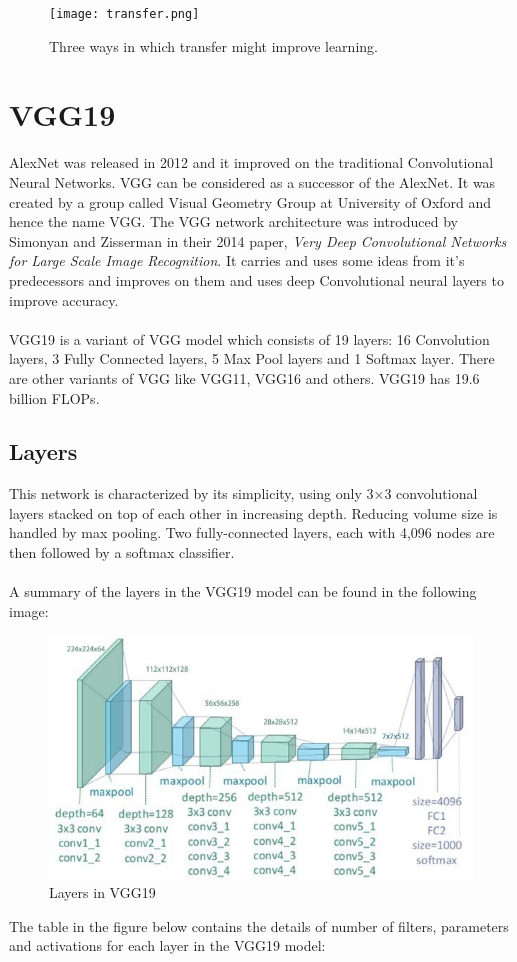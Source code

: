 \begin{figure}[h]
	\label{ss}
	\centering
	\texttt{[image: transfer.png]}
	\caption{Three ways in which transfer might improve learning.}
\end{figure}

\section{VGG19}
AlexNet was released in 2012 and it improved on the traditional Convolutional Neural Networks. VGG can be considered as a successor of the AlexNet. It was created by a group called Visual Geometry Group at University of Oxford and hence the name VGG. The VGG network architecture was introduced by Simonyan and Zisserman in their 2014 paper, \emph{Very Deep Convolutional Networks for Large Scale Image Recognition}. It carries and uses some ideas from it's predecessors and improves on them and uses deep Convolutional neural layers to improve accuracy.\\\\
VGG19 is a variant of VGG model which consists of 19 layers: 16 Convolution layers, 3 Fully Connected layers, 5 Max Pool layers and 1 Softmax layer. There are other variants of VGG like VGG11, VGG16 and others. VGG19 has 19.6 billion FLOPs.\pagebreak

\subsection{Layers}
This network is characterized by its simplicity, using only 3×3 convolutional layers stacked on top of each other in increasing depth. Reducing volume size is handled by max pooling. Two fully-connected layers, each with 4,096 nodes are then followed by a softmax classifier.\\\\
A summary of the layers in the VGG19 model can be found in the following image:\\

\begin{figure}[h]
	\label{ss}
	\centering
	\includegraphics[width= 16 cm]{vgg19-layers.png}
	\caption{Layers in VGG19}
\end{figure}
\pagebreak
The table in the figure below contains the details of number of filters, parameters and activations for each layer in the VGG19 model:\\

